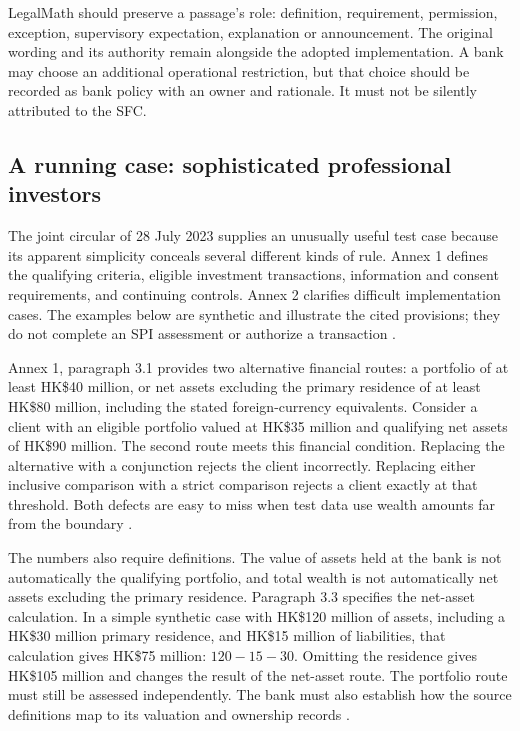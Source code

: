 LegalMath should preserve a passage's role: definition, requirement, permission,
exception, supervisory expectation, explanation or announcement. The original
wording and its authority remain alongside the adopted implementation. A bank may
choose an additional operational restriction, but that choice should be recorded
as bank policy with an owner and rationale. It must not be silently attributed to
the SFC.

\subsection{A running case: sophisticated professional investors}
\label{sec:spi}

The joint circular of 28 July 2023 supplies an unusually useful test case because
its apparent simplicity conceals several different kinds of rule. Annex 1
defines the qualifying criteria, eligible investment transactions, information
and consent requirements, and continuing controls. Annex 2 clarifies difficult
implementation cases. The examples below are synthetic and illustrate the cited
provisions; they do not complete an SPI assessment or authorize a transaction
\citep{sfcspi,sfcspiannex1,sfcspiannex2}.

Annex 1, paragraph 3.1 provides two alternative financial routes: a portfolio of
at least HK\$40 million, or net assets excluding the primary residence of at least
HK\$80 million, including the stated foreign-currency equivalents. Consider a
client with an eligible portfolio valued at HK\$35 million and qualifying net
assets of HK\$90 million. The second route meets this financial condition.
Replacing the alternative with a conjunction rejects the client incorrectly.
Replacing either inclusive comparison with a strict comparison rejects a client
exactly at that threshold. Both defects are easy to miss when test data use
wealth amounts far from the boundary \citep[Annex 1, para.~3.1]{sfcspiannex1}.

The numbers also require definitions. The value of assets held at the bank is
not automatically the qualifying portfolio, and total wealth is not automatically
net assets excluding the primary residence. Paragraph 3.3 specifies the net-asset
calculation. In a simple synthetic case with HK\$120 million of assets, including
a HK\$30 million primary residence, and HK\$15 million of liabilities, that
calculation gives HK\$75 million: $120-15-30$. Omitting the residence gives
HK\$105 million and changes the result of the net-asset route. The portfolio
route must still be assessed independently. The bank must also establish how the
source definitions map to its valuation and ownership records
\citep[Annex 1, paras.~3.2--3.4]{sfcspiannex1}.

